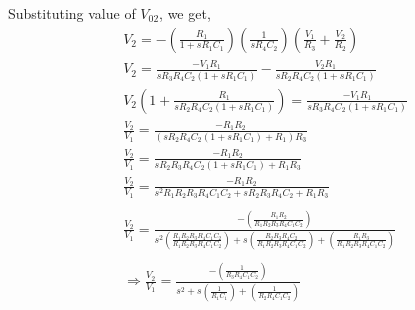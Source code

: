 \documentclass[a4paper,11pt]{article}
\newcommand\ddfrac[2]{\frac{\displaystyle #1}{\displaystyle #2}}
\begin{document}
Substituting value of $V_{02}$, we get,
\begin{equation*}
    \begin{aligned}
         & V_2=-\left(\frac{R_1}{1+sR_1C_1}\right)\left(\frac{1}{sR_4C_2}\right)\left(\frac{V_1}{R_3}+\frac{V_2}{R_2}\right)                                                                                                                            \\
         & V_2=\frac{-V_1R_1}{sR_3R_4C_2(1+sR_1C_1)}-\frac{V_2R_1}{sR_2R_4C_2(1+sR_1C_1)}                                                                                                                                                               \\
         & V_2\left(1+\frac{R_1}{sR_2R_4C_2(1+sR_1C_1)}\right)=\frac{-V_1R_1}{sR_3R_4C_2(1+sR_1C_1)}                                                                                                                                                    \\
         & \frac{V_2}{V_1}=\frac{-R_1R_2}{(sR_2R_4C_2(1+sR_1C_1)+R_1)R_3}                                                                                                                                                                               \\
         & \frac{V_2}{V_1}=\frac{-R_1R_2}{sR_2R_3R_4C_2(1+sR_1C_1)+R_1R_3}                                                                                                                                                                              \\
         & \frac{V_2}{V_1}=\frac{-R_1R_2}{s^2R_1R_2R_3R_4C_1C_2+sR_2R_3R_4C_2+R_1R_3}                                                                                                                                                                   \\\\
         & \frac{V_2}{V_1}=\ddfrac{-\left(\frac{R_1R_2}{R_1R_2R_3R_4C_1C_2}\right)}{s^2\left(\frac{R_1R_2R_3R_4C_1C_2}{R_1R_2R_3R_4C_1C_2}\right)+s\left(\frac{R_2R_3R_4C_2}{R_1R_2R_3R_4C_1C_2}\right)+\left(\frac{R_1R_3}{R_1R_2R_3R_4C_1C_2}\right)} \\\\
         & \Rightarrow \frac{V_2}{V_1}=\ddfrac{-\left(\frac{1}{R_3R_4C_1C_2}\right)}{s^2+s\left(\frac{1}{R_1C_1}\right)+\left(\frac{1}{R_2R_4C_1C_2}\right)}                                                                                            \\\\
    \end{aligned}
\end{equation*}
\end{document}
